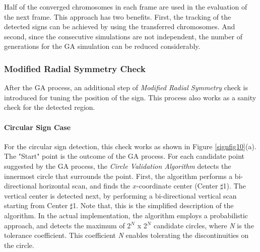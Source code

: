 \documentclass[review,number]{elsarticle}
\begin{document}
\par
Half of the converged chromosomes in each frame are used in the evaluation of the next frame. This approach has two benefits. First, the tracking of the detected signs can be achieved by using the transferred chromosomes. And second, since the consecutive simulations are not independent, the number of generations for the GA simulation can be reduced considerably.

\subsubsection{Modified Radial Symmetry Check}

After the GA process, an additional step of \textsl{Modified Radial Symmetry} check is introduced for tuning the position of the sign. This process also works as a sanity check for the detected region.

\par
\paragraph{Circular Sign Case}
For the circular sign detection, this check works as shown in Figure \ref{signfig10}(a). The "Start" point is the outcome of the GA process. For each candidate point suggested by the GA process, the \textit{Circle Validation Algorithm} detects the innermost circle that surrounds the point. First, the algorithm performs a bi-directional horizontal scan, and finds the $x$-coordinate center (Center $\sharp$1). The vertical center is detected next, by performing a bi-directional vertical scan starting from Center $\sharp$1. Note that, this is the simplified description of the algorithm. In the actual implementation, the algorithm employs a probabilistic approach, and detects the maximum of 2$^\textit{N}$ x 2$^\textit{N}$ candidate circles, where \textit{N} is the tolerance coefficient. This coefficient \textit{N} enables tolerating the discontinuities on the circle.
\end{document}
